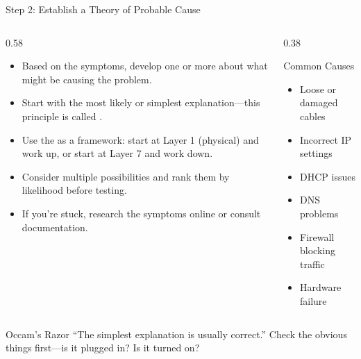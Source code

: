 \documentclass[aspectratio=169]{beamer}  %
\begin{document}
\begin{frame}{Step 2: Establish a Theory of Probable Cause}
    \begin{columns}[T]
        \begin{column}{0.58\textwidth}
            \begin{itemize}
                \small
                \item Based on the symptoms, develop one or more  about what might be causing the problem.
                \item Start with the most likely or simplest explanation---this principle is called .
                \item Use the  as a framework: start at Layer 1 (physical) and work up, or start at Layer 7 and work down.
                \item Consider multiple possibilities and rank them by likelihood before testing.
                \item If you're stuck, research the symptoms online or consult documentation.
            \end{itemize}
        \end{column}
        \begin{column}{0.38\textwidth}
            \begin{block}{Common Causes}
                \begin{itemize}
                    \item Loose or damaged cables
                    \item Incorrect IP settings
                    \item DHCP issues
                    \item DNS problems
                    \item Firewall blocking traffic
                    \item Hardware failure
                \end{itemize}
            \end{block}
        \end{column}
    \end{columns}
    
    \begin{alertblock}{Occam's Razor}
        ``The simplest explanation is usually correct.'' Check the obvious things first---is it plugged in? Is it turned on?
    \end{alertblock}
\end{frame}
\end{document}
